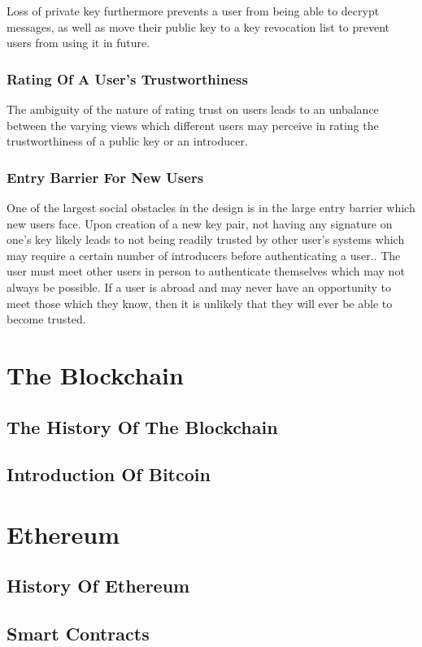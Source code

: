 Loss of private key furthermore prevents a user from being able to decrypt messages, as well as move their public key to a key revocation list to prevent users from using it in future.

\subsubsection{Rating Of A User’s Trustworthiness}
The ambiguity of the nature of rating trust on users leads to an unbalance between the varying views which different users may perceive in rating the trustworthiness of a public key or an introducer.

\subsubsection{Entry Barrier For New Users}
One of the largest social obstacles in the design is in the large entry barrier which new users face. Upon creation of a new key pair, not having any signature on one’s key likely leads to not being readily trusted by other user’s systems which may require a certain number of introducers before authenticating a user.. The user must meet other users in person to authenticate themselves which may not always be possible. If a user is abroad and may never have an opportunity to meet those which they know, then it is unlikely that they will ever be able to become trusted.

\section{The Blockchain}
\subsection{The History Of The Blockchain}
\subsection{Introduction Of Bitcoin}

\section{Ethereum}
\subsection{History Of Ethereum}
\subsection{Smart Contracts}
